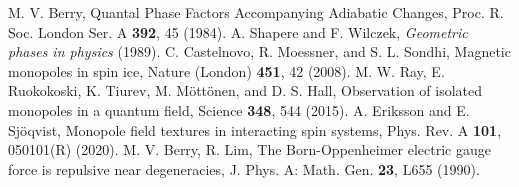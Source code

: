 \documentclass [a4paper]{article}
\begin{document}
\begin{thebibliography}{99}
 M. V. Berry, 
Quantal Phase Factors Accompanying Adiabatic Changes, 
Proc. R. Soc. London Ser. A {\bf 392}, 45 (1984).  
 A. Shapere and F. Wilczek, 
{\it Geometric phases in physics} (1989). 
 C. Castelnovo, R. Moessner, and S. L. Sondhi, 
Magnetic monopoles in spin ice, Nature (London) {\bf 451}, 42 (2008).
 M. W. Ray, E. Ruokokoski, K. Tiurev, M. M\"ott\"onen, and D. S. Hall, 
Observation of isolated monopoles in a quantum field, 
Science {\bf 348}, 544 (2015).
 A. Eriksson and E. Sj\"oqvist, 
Monopole field textures in interacting spin systems, 
Phys. Rev. A {\bf 101}, 050101(R) (2020). 
 M. V. Berry, R. Lim,
The Born-Oppenheimer electric gauge force is repulsive near degeneracies,
J. Phys. A: Math. Gen. {\bf 23}, L655 (1990).
\end{thebibliography}
\end{document}
